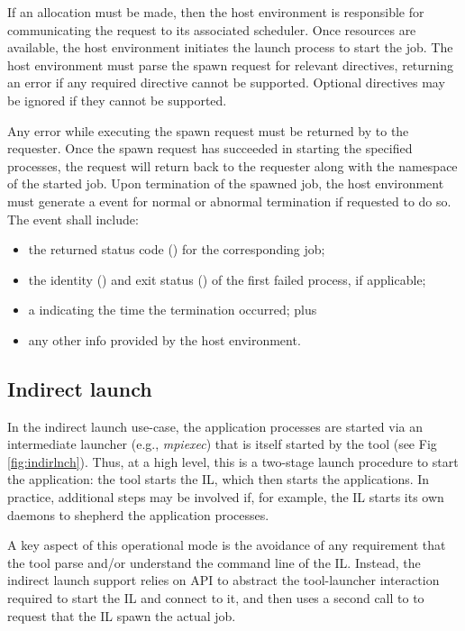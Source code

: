 If an allocation must be made, then the host environment is responsible for
communicating the request to its associated scheduler. Once resources are
available, the host environment initiates the launch process to start the job.
The host environment must parse the spawn request for relevant directives,
returning an error if any required directive cannot be supported. Optional
directives may be ignored if they cannot be supported.

Any error while executing the spawn request must be returned by
 to the requester. Once the spawn request has succeeded in
starting the specified processes, the request will return
 back to the requester along with the namespace of the
started job. Upon termination of the spawned job, the host environment must
generate a  event for normal or abnormal
termination if requested to do so. The event shall include:

\begin{itemize}
    \item the returned status code () for the
    corresponding job;
    \item the identity () and exit status
    () of the first failed process, if applicable;
    \item a  indicating the time the termination
    occurred; plus
    \item any other info provided by the host environment.
\end{itemize}

\subsection{Indirect launch}
\label{chap:api_tools:indirect}

In the indirect launch use-case, the application processes are started via an intermediate launcher (e.g., \emph{mpiexec}) that is itself started by the tool (see Fig \ref{fig:indirlnch}). Thus, at a high level, this is a two-stage launch procedure to start the application: the tool starts the \ac{IL}, which then starts the applications. In practice, additional steps may be involved if, for example, the \ac{IL} starts its own daemons to shepherd the application processes.

A key aspect of this operational mode is the avoidance of any requirement that the tool parse and/or understand the command line of the \ac{IL}. Instead, the indirect launch support relies on  \ac{API} to abstract the tool-launcher interaction required to start the \ac{IL} and connect to it, and then uses a second call to  to request that the \ac{IL} spawn the actual job.

